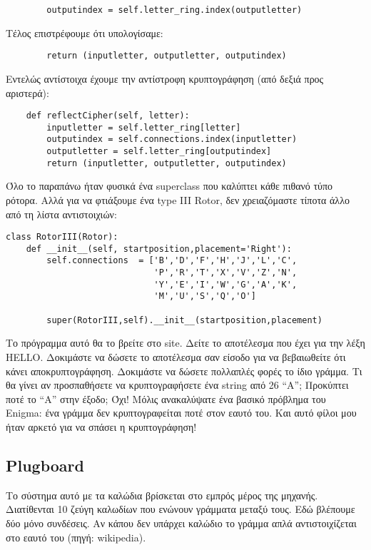 \documentclass[a4paper,twoside,12pt]{article}
\begin{document}
\begin{verbatim}
        outputindex = self.letter_ring.index(outputletter)
\end{verbatim}

Τέλος επιστρέφουμε ότι υπολογίσαμε:

\begin{verbatim}
        return (inputletter, outputletter, outputindex)
\end{verbatim}

Εντελώς αντίστοιχα έχουμε την αντίστροφη κρυπτογράφηση (από δεξιά προς αριστερά):

\begin{verbatim}
    def reflectCipher(self, letter):
        inputletter = self.letter_ring[letter]
        outputindex = self.connections.index(inputletter)
        outputletter = self.letter_ring[outputindex]
        return (inputletter, outputletter, outputindex)
\end{verbatim}

Όλο το παραπάνω ήταν φυσικά ένα superclass που καλύπτει κάθε πιθανό τύπο ρότορα. Αλλά για να φτιάξουμε ένα type III Rotor, δεν χρειαζόμαστε τίποτα άλλο από τη λίστα αντιστοιχιών:

\begin{verbatim}
class RotorIII(Rotor):
    def __init__(self, startposition,placement='Right'):
        self.connections  = ['B','D','F','H','J','L','C',
                             'P','R','T','X','V','Z','N',
                             'Y','E','I','W','G','A','K',
                             'M','U','S','Q','O']

        super(RotorIII,self).__init__(startposition,placement)
\end{verbatim}

Το πρόγραμμα αυτό θα το βρείτε στο site. Δείτε το αποτέλεσμα που έχει για την λέξη HELLO. Δοκιμάστε να δώσετε το αποτέλεσμα σαν είσοδο για να βεβαιωθείτε ότι κάνει αποκρυπτογράφηση. Δοκιμάστε να δώσετε πολλαπλές φορές το ίδιο γράμμα. Τι θα γίνει αν προσπαθήσετε να κρυπτογραφήσετε ένα string από 26 “Α”; Προκύπτει ποτέ το “Α” στην έξοδο; Όχι! Μόλις ανακαλύψατε ένα βασικό πρόβλημα του Enigma: ένα γράμμα δεν κρυπτογραφείται ποτέ στον εαυτό του. Και αυτό φίλοι μου ήταν αρκετό για να σπάσει η κρυπτογράφηση!

\subsection{Plugboard}

Το σύστημα αυτό με τα καλώδια βρίσκεται στο εμπρός μέρος της μηχανής. Διατίθενται 10 ζεύγη καλωδίων που ενώνουν γράμματα μεταξύ τους. Εδώ βλέπουμε δύο μόνο συνδέσεις. Αν κάπου δεν υπάρχει καλώδιο το γράμμα απλά αντιστοιχίζεται στο εαυτό του (πηγή: wikipedia).
\end{document}
